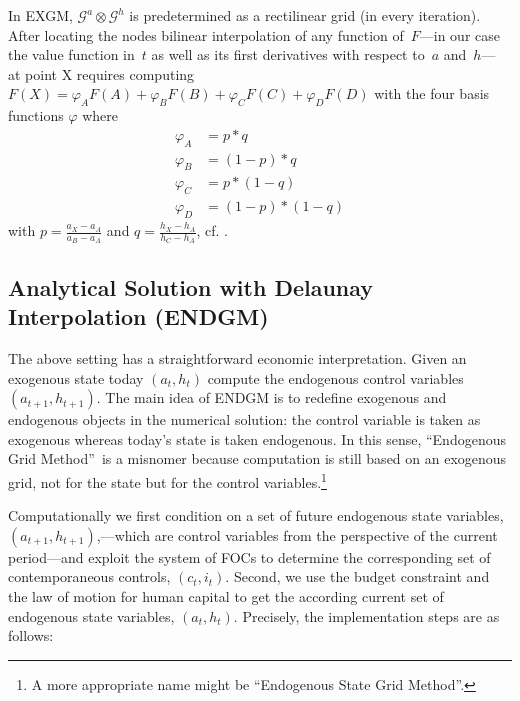 \documentclass[a4paper,12pt]{article}%
\begin{document}
In EXGM, $\mathcal{G}^{a}\otimes\mathcal{G}^{h}$ is predetermined as a rectilinear grid (in every iteration). After locating the nodes bilinear interpolation of any function of~$F$---in our case the value function in~$t$ as well as its first derivatives with respect to~$a$ and~$h$--- at point X requires computing $F\left(  X\right)  =\varphi_{A}F(A)+\varphi_{B}F(B)+\varphi_{C}F(C)+\varphi_{D}F(D)$ with the four basis functions $\varphi$ where
\begin{align*}
\varphi_{A}  &  =p\ast q\\
\varphi_{B}  &  =\left(  1-p\right)  \ast q\\
\varphi_{C}  &  =p\ast\left(  1-q\right) \\
\varphi_{D}  &  =\left(  1-p\right)  \ast\left(  1-q\right)
\end{align*}
with $p=\frac{a_{X}-a_{A}}{a_{B}-a_{A}}$ and $q=\frac{h_{X}-h_{A}}{h_{C}%
-h_{A}}$, cf. .

\subsection{Analytical Solution with Delaunay Interpolation \newline(ENDGM)}

\label{ss:analendgm}

The above setting has a straightforward economic interpretation. Given an exogenous state today $\left(  a_{t},h_{t}\right)$ compute the endogenous control variables $\left( a_{t+1},h_{t+1}\right)  $. The main idea of ENDGM is to redefine exogenous and endogenous objects in the numerical solution: the control variable is taken as exogenous whereas today's state is taken endogenous. In this sense, \textquotedblleft Endogenous Grid Method\textquotedblright\ is a misnomer because computation is still based on an exogenous grid, not for the state but for the control variables.\footnote{A more appropriate name might be \textquotedblleft Endogenous State Grid Method\textquotedblright.}

Computationally we first condition on a set of future endogenous state variables, $\left(  a_{t+1},h_{t+1}\right)$,---which are control variables from the perspective of the current period---and exploit the system of FOCs to determine the corresponding set of contemporaneous controls, $\left( c_{t},i_{t}\right)$. Second, we use the budget constraint and the law of motion for human capital to get the according current set of endogenous state variables, $\left(  a_{t},h_{t}\right)$. Precisely, the implementation steps are as follows:
\end{document}
